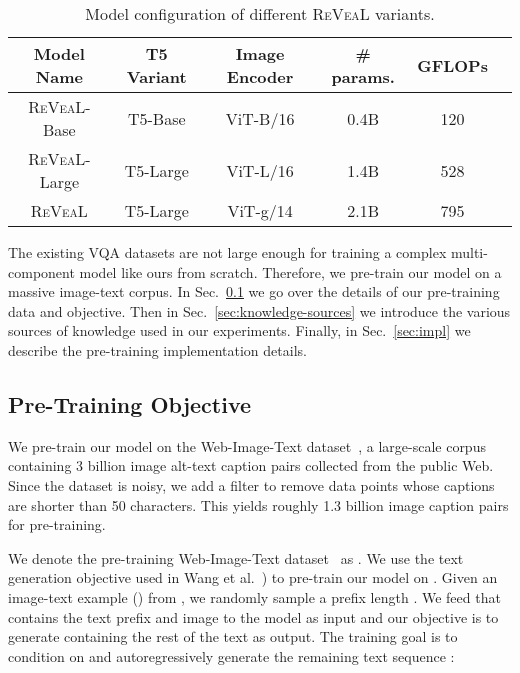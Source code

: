 \documentclass[10pt,twocolumn,letterpaper]{article}
\newcommand{\method}{R\textsc{e}V\textsc{ea}L\xspace}
\begin{document}
{ \setlength\tabcolsep{2pt} 
\begin{table}[t!]
\centering
\footnotesize
\begin{tabular}{c|ccc|cc} \toprule
Model Name & T5 Variant & Image Encoder &\# params. & GFLOPs \\ \midrule
\method-Base & T5-Base  & ViT-B/16 &  0.4B & 120 \\ 
\method-Large & T5-Large & ViT-L/16  & 1.4B & 528 \\ 
\method & T5-Large & ViT-g/14  &  2.1B & 795\\ \bottomrule
\end{tabular}
    \vspace{-.1in}
\caption{Model configuration of different \method variants.}
\label{tab:variant}
\end{table}
}




The existing VQA datasets are not large enough for training a complex multi-component model like ours from scratch. Therefore, we pre-train our model on a massive image-text corpus. 
In Sec.~\ref{sec:objective} we go over the details of our pre-training data and objective. Then in Sec.~\ref{sec:knowledge-sources} we introduce the various sources of knowledge used in our experiments. Finally, in Sec.~\ref{sec:impl} we describe the pre-training implementation details.
\subsection{Pre-Training Objective} \label{sec:objective}
We pre-train our model on the Web-Image-Text dataset~\cite{DBLP:conf/cvpr/ZhaiWMSK0B22}, a large-scale corpus containing 3 billion image alt-text caption pairs collected from the public Web. Since the dataset is noisy, we add a filter to remove data points whose captions are shorter than 50 characters. This yields roughly 1.3 billion image caption pairs for pre-training.

We denote the pre-training Web-Image-Text dataset~\cite{DBLP:conf/cvpr/ZhaiWMSK0B22} as . We use the text generation objective used in Wang et al.~\cite{DBLP:conf/iclr/WangYYDT022}) to pre-train our model on . Given an image-text example () from ,
we randomly sample a prefix length . We feed  that contains the text prefix and image to the model as input and our objective is to generate  containing the rest of the text as output. The training goal is to condition on  and autoregressively generate the remaining text sequence :
{\small

}
\end{document}
